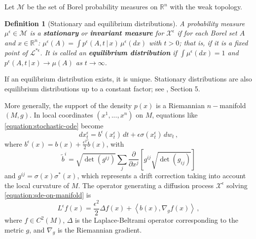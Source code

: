 \documentclass[12pt]{article}
\newtheorem{definition}[theorem]{Definition}
\begin{document}
Let $\mathcal{M}$ be the set of Borel probability measures on $\mathbb{R}^n$ with the weak topology. 

\begin{definition}[Stationary and equilibrium distributions]
\label{definition:stationary-or-invariant-measures}
    A probability measure $\mu^{\epsilon} \in \mathcal{M}$ is a \textbf{\textit{stationary}} or \textbf{\textit{invariant measure}} for $\mathcal{X}^{\epsilon}$ if for each Borel set $A$ and $x \in \mathbb{R}^n$: ${\mu^{\epsilon}(A) = \int p^{\epsilon}(A, t \, | \, x) \, \mu^{\epsilon}(dx)}$ with $t>0$; that is, if it is a fixed point of $\mathcal{L}^{*\epsilon}$. It is called an \textbf{\textit{equilibrium distribution}} if ${\int \mu^{\epsilon}(dx)=1}$ and ${p^{\epsilon}(A, t \, | \, x)\rightarrow \mu(A)}$ as $t\rightarrow \infty$.
\end{definition}

If an equilibrium distribution exists, it is unique. Stationary distributions are also equilibrium distributions up to a constant factor; see \cite{kent1978time}, Section 5. 

More generally, the support of the density \( p(x) \) is a Riemannian $n-$manifold $(M,g)$. In local coordinates $(x^1,...,x^n)$ on $M$, equations like \eqref{equation:stochastic-ode} become
\begin{equation}
\label{equation:sde-on-manifold}
    d{x_t^{\epsilon}} = b^{\epsilon}(x_t^{\epsilon}) \,dt + \epsilon \sigma(x_t^{\epsilon}) \,dw_t \, ,
\end{equation}
where $b^{\epsilon}(x) = b(x) + \frac{\epsilon^2}{2}\widetilde{b}(x)$, with
\begin{equation*}
    \widetilde{b}^i = \sqrt{\det(g^{ij})}\sum_j\frac{\partial}{\partial x^j}\left [ g^{ij}\sqrt{\det(g_{ij})} \right]
\end{equation*}
and $g^{ij} = \sigma(x)\sigma^*(x)$, which represents a drift correction taking into account the local curvature of $M$. The operator generating a diffusion process $\mathcal{X}^{\epsilon}$ solving \eqref{equation:sde-on-manifold} is
\begin{equation*}
\label{equation:perturbations-morse-smale-gradient-operator}
    L^{\epsilon}f(x) = \frac{\epsilon^2}{2}\Delta f(x) + \left<b(x), \nabla_g f(x) \right > \, ,
\end{equation*}
where $f \in C^{2}(M)$, $\Delta$ is the Laplace-Beltrami operator corresponding to the metric $g$, and $\nabla_g$ is the Riemannian gradient. 
\end{document}
